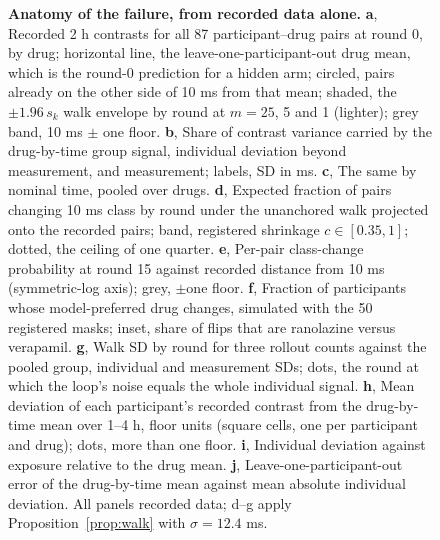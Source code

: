 \documentclass[11pt,a4paper]{article}
\begin{document}
\begin{figure}[!htbp]\centering
{}
\caption{\textbf{Anatomy of the failure, from recorded data alone.} \textbf{a}, Recorded 2 h contrasts for all 87 participant--drug pairs at round 0, by drug; horizontal line, the leave-one-participant-out drug mean, which is the round-0 prediction for a hidden arm; circled, pairs already on the other side of 10 ms from that mean; shaded, the $\pm1.96\,s_k$ walk envelope by round at $m=25$, 5 and 1 (lighter); grey band, 10 ms $\pm$ one floor. \textbf{b}, Share of contrast variance carried by the drug-by-time group signal, individual deviation beyond measurement, and measurement; labels, SD in ms. \textbf{c}, The same by nominal time, pooled over drugs. \textbf{d}, Expected fraction of pairs changing 10 ms class by round under the unanchored walk projected onto the recorded pairs; band, registered shrinkage $c\in[0.35,1]$; dotted, the ceiling of one quarter. \textbf{e}, Per-pair class-change probability at round 15 against recorded distance from 10 ms (symmetric-log axis); grey, $\pm$one floor. \textbf{f}, Fraction of participants whose model-preferred drug changes, simulated with the 50 registered masks; inset, share of flips that are ranolazine versus verapamil. \textbf{g}, Walk SD by round for three rollout counts against the pooled group, individual and measurement SDs; dots, the round at which the loop's noise equals the whole individual signal. \textbf{h}, Mean deviation of each participant's recorded contrast from the drug-by-time mean over 1--4 h, floor units (square cells, one per participant and drug); dots, more than one floor. \textbf{i}, Individual deviation against exposure relative to the drug mean. \textbf{j}, Leave-one-participant-out error of the drug-by-time mean against mean absolute individual deviation. All panels recorded data; d--g apply Proposition~\ref{prop:walk} with $\sigma=12.4$ ms.}\label{fig:anatomy}
\end{figure}
\FloatBarrier
\end{document}
